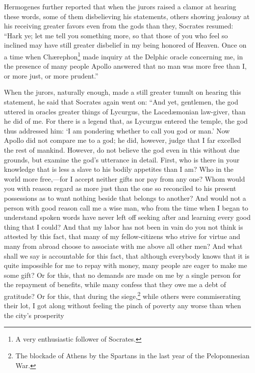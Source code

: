 \documentclass[12pt]{article}
\begin{document}
Hermogenes further reported that when the jurors raised a clamor at hearing
these words, some of them disbelieving his statements, others showing jealousy
at his receiving greater favors even from the gods than they, Socrates resumed:
``Hark ye; let me tell you something more, so that those of you who feel so
inclined may have still greater disbelief in my being honored of Heaven. Once
on a time when Ch{\ae}rephon\footnote{A very enthusiastic follower of
Socrates.} made inquiry at the Delphic oracle concerning me, in the presence of
many people Apollo answered that no man was more free than I, or more just, or
more prudent.''

When the jurors, naturally enough, made a still greater tumult on hearing this
statement, he said that Socrates again went on: ``And yet, gentlemen, the god
uttered in oracles greater things of Lycurgus, the Laced{\ae}monian law-giver,
than he did of me. For there is a legend that, as Lycurgus entered the temple,
the god thus addressed him: `I am pondering whether to call you god or man.'
Now Apollo did not compare me to a god; he did, however, judge that I far
excelled the rest of mankind. However, do not believe the god even in this
without due grounds, but examine the god's utterance in detail. First, who is
there in your knowledge that is less a slave to his bodily appetites than I am?
Who in the world more free,---for I accept neither gifts nor pay from any one?
Whom would you with reason regard as more just than the one so reconciled to
his present possessions as to want nothing beside that belongs to another? And
would not a person with good reason call me a wise man, who from the time when
I began to understand spoken words have never left off seeking after and
learning every good thing that I could? And that my labor has not been in vain
do you not think is attested by this fact, that many of my fellow-citizens who
strive for virtue and many from abroad choose to associate with me above all
other men? And what shall we say is accountable for this fact, that although
everybody knows that it is quite impossible for me to repay with money, many
people are eager to make me some gift? Or for this, that no demands are made on
me by a single person for the repayment of benefits, while many confess that
they owe me a debt of gratitude? Or for this, that during the
siege,\footnote{The blockade of Athens by the Spartans in the last year of the
Peloponnesian War.} while others were commiserating their lot, I got along
without feeling the pinch of poverty any worse than when the city's prosperity
\end{document}
